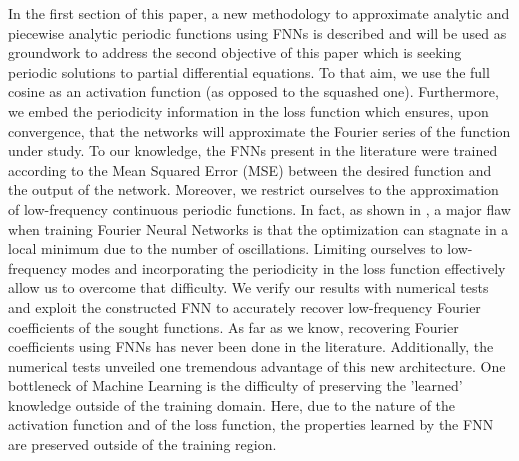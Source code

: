 \documentclass[AMS,STIX1COL]{WileyNJD-v2}
\begin{document}
In the first section of this paper, a new methodology to approximate analytic and piecewise analytic periodic functions using FNNs is described and will be used as groundwork to address the second objective of this paper which is seeking periodic solutions to partial differential equations. To that aim, we use the full cosine as an activation function (as opposed to the squashed one). Furthermore, we embed the periodicity information in the loss function which ensures, upon convergence, that the networks will approximate the Fourier series of the function under study. To our knowledge, the FNNs present in the literature \cite{Zhumekonov2019} were trained according to the Mean Squared Error (MSE) between the desired function and the output of the network. Moreover, we restrict ourselves to the approximation of low-frequency continuous periodic functions. In fact, as shown in \cite{Parascandolo2017}, a major flaw when training Fourier Neural Networks is that the optimization can stagnate in a local minimum due to the number of oscillations. Limiting ourselves to low-frequency modes and incorporating the periodicity in the loss function effectively allow us to overcome that difficulty. We verify our results with numerical tests and exploit the constructed FNN to accurately recover low-frequency Fourier coefficients of the sought functions. As far as we know, recovering Fourier coefficients using FNNs has never been done in the literature. Additionally, the numerical tests unveiled one tremendous advantage of this new architecture. One bottleneck of Machine Learning is the difficulty of preserving the 'learned' knowledge outside of the training domain. Here, due to the nature of the activation function and of the loss function, the properties learned by the FNN are preserved outside of the training region. 



\end{document}
